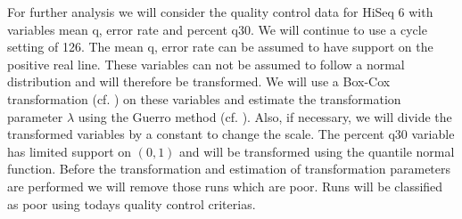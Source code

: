 \documentclass[a4paper,11pt,fleqn,twoside,notitlepage]{report}
\begin{document}
For further analysis we will consider the quality control data for HiSeq 6 with variables mean q, error rate and percent q30. We will continue to use a cycle setting of 126. The mean q, error rate can be assumed to have support on the positive real line. These variables can not be assumed to follow a normal distribution and will therefore be transformed. We will use a Box-Cox transformation (cf. \citet{BoxCox}) on these variables and estimate the transformation parameter $\lambda$ using the Guerro method (cf. \citet{Gurrero}). Also, if necessary, we will divide the transformed variables by a constant to change the scale. The percent q30 variable has limited support on $(0,1)$ and will be transformed using the quantile normal function. Before the transformation and estimation of transformation parameters are performed we will remove those runs which are poor. Runs will be classified as poor using todays quality control criterias. 
\end{document}

